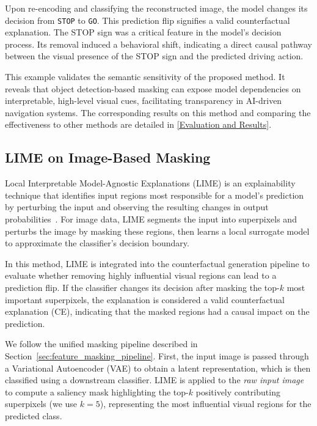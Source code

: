 Upon re-encoding and classifying the reconstructed image, the model changes its decision from \texttt{STOP} to \texttt{GO}. This prediction flip signifies a valid counterfactual explanation. The STOP sign was a critical feature in the model’s decision process. Its removal induced a behavioral shift, indicating a direct causal pathway between the visual presence of the STOP sign and the predicted driving action.

This example validates the semantic sensitivity of the proposed method. It reveals that object detection-based masking can expose model dependencies on interpretable, high-level visual cues, facilitating transparency in AI-driven navigation systems. The corresponding results on this method and comparing the effectiveness to other methods are detailed in \cref{Evaluation and Results}.





\subsection{LIME on Image-Based Masking}
\label{sec:lime_on_images}

Local Interpretable Model-Agnostic Explanations (LIME) is an explainability technique that identifies input regions most responsible for a model’s prediction by perturbing the input and observing the resulting changes in output probabilities~\cite{Ribeiro2018}. For image data, LIME segments the input into superpixels and perturbs the image by masking these regions, then learns a local surrogate model to approximate the classifier’s decision boundary.

In this method, LIME is integrated into the counterfactual generation pipeline to evaluate whether removing highly influential visual regions can lead to a prediction flip. If the classifier changes its decision after masking the top-$k$ most important superpixels, the explanation is considered a valid counterfactual explanation (CE), indicating that the masked regions had a causal impact on the prediction.

We follow the unified masking pipeline described in Section~\ref{sec:feature_masking_pipeline}. First, the input image is passed through a Variational Autoencoder (VAE) to obtain a latent representation, which is then classified using a downstream classifier. LIME is applied to the \emph{raw input image} to compute a saliency mask highlighting the top-$k$ positively contributing superpixels (we use $k=5$), representing the most influential visual regions for the predicted class.

